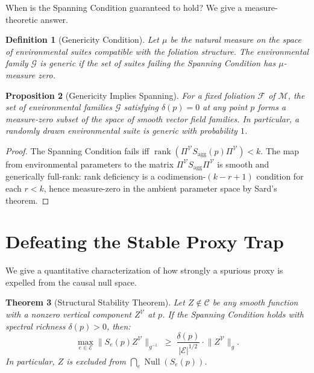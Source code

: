 \documentclass[11pt,a4paper]{article}
\newtheorem{theorem}{Theorem}[section]
\newtheorem{proposition}[theorem]{Proposition}
\newtheorem{definition}[theorem]{Definition}
\DeclareMathOperator{\Null}{Null}
\DeclareMathOperator{\rank}{rank}
\newcommand{\cC}{\mathcal{C}}
\newcommand{\cM}{\mathcal{M}}
\newcommand{\cF}{\mathcal{F}}
\newcommand{\cG}{\mathcal{G}}
\newcommand{\cV}{\mathcal{V}}
\newcommand{\cE}{\mathcal{E}}
\begin{document}
When is the Spanning Condition guaranteed to hold? We give a measure-theoretic answer.

\begin{definition}[Genericity Condition]
Let $\mu$ be the natural measure on the space of environmental suites compatible with the foliation structure. The environmental family $\cG$ is \emph{generic} if the set of suites failing the Spanning Condition has $\mu$-measure zero.
\end{definition}

\begin{proposition}[Genericity Implies Spanning]
For a fixed foliation $\cF$ of $\cM$, the set of environmental families $\cG$ satisfying $\delta(p) = 0$ at any point $p$ forms a measure-zero subset of the space of smooth vector field families. In particular, a randomly drawn environmental suite is generic with probability $1$.
\end{proposition}

\begin{proof}
The Spanning Condition fails iff $\rank(\Pi^\cV S_{\mathrm{agg}}(p)\Pi^\cV) < k$. The map from environmental parameters to the matrix $\Pi^\cV S_{\mathrm{agg}} \Pi^\cV$ is smooth and generically full-rank: rank deficiency is a codimension-$(k - r + 1)$ condition for each $r < k$, hence measure-zero in the ambient parameter space by Sard's theorem.
\end{proof}

\section{Defeating the Stable Proxy Trap}
\label{sec:proxy}

We give a quantitative characterization of how strongly a spurious proxy is expelled from the causal null space.

\begin{theorem}[Structural Stability Theorem]\label{thm:stability}
Let $Z \notin \cC$ be any smooth function with a nonzero vertical component $Z^\cV$ at $p$. If the Spanning Condition holds with spectral richness $\delta(p) > 0$, then:
\[
\max_{e \in \cE} \bigl\|S_e(p) Z^\cV\bigr\|_{g^{-1}} \;\geq\; \frac{\delta(p)}{|\cE|^{1/2}} \cdot \bigl\|Z^\cV\bigr\|_g.
\]
In particular, $Z$ is excluded from $\bigcap_e \Null(S_e(p))$.
\end{theorem}
\end{document}

